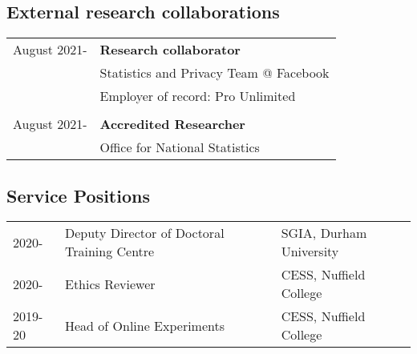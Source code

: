 \documentclass[11pt, a4paper]{article}
\begin{document}
\subsection*{External research collaborations}


\begin{tabular}{ll}
    August 2021- & \textbf{Research collaborator} \\
    & Statistics and Privacy Team @ Facebook\\
    & Employer of record: Pro Unlimited\\
\\
    August 2021- & \textbf{Accredited Researcher} \\
    & Office for National Statistics \\

 \end{tabular}

 \subsection*{Service Positions}

 \begin{tabular}{lll}
   2020- & Deputy Director of Doctoral Training Centre & SGIA, Durham University \\
   2020- & Ethics Reviewer & CESS, Nuffield College \\
   2019-20 & Head of Online Experiments & CESS, Nuffield College \\
   
 \end{tabular}


\end{document}
